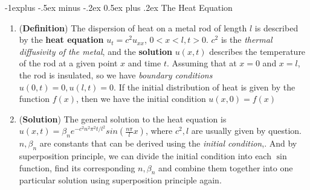 \documentclass[10pt, landscape]{article}
\makeatletter
\renewcommand{\subsection}{\@startsection{subsection}{2}{0mm}%
                                {-1explus -.5ex minus -.2ex}%
                                {0.5ex plus .2ex}%
                                {\normalfont\normalsize\bfseries}}
\makeatother
\begin{document}
\begin{multicols}{4}
\subsection{The Heat Equation}
\begin{enumerate}
    \item (\textbf{Definition}) The dispersion of heat on a metal rod of length $l$ is described by the \textbf{heat equation} $u_t=c^2u_{xx}$, $0<x<l,t>0$. $c^2$ is the \textit{thermal diffusivity of the metal}, and the \textbf{solution} $u(x,t)$ describes the temperature of the rod at a given point $x$ and time $t$. Assuming that at $x=0$ and $x=l$, the rod is insulated, so we have \textit{boundary conditions} $u(0,t)=0,u(l,t)=0$. If the initial distribution of heat is given by the function $f(x)$, then we have the initial condition $u(x,0)=f(x)$
    \item (\textbf{Solution}) The general solution to the heat equation is $u(x,t)=\beta_ne^{-c^2n^2\pi^2t/l^2}sin(\frac{n\pi}{l}x)$, where $c^2,l$ are usually given by question. $n,\beta_n$ are constants that can be derived using the \textit{initial condition},. And by superposition principle, we can divide the initial condition into each $\sin$ function, find its corresponding $n,\beta_n$ and combine them together into one particular solution using superposition principle again.
\end{enumerate}

\end{multicols}
\hrulefill \\

\begin{multicols}{3}
\end{multicols}
\end{document}
